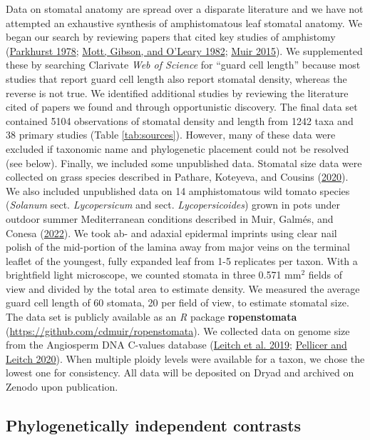 \documentclass[
  12pt,
]{article}
\begin{document}
Data on stomatal anatomy are spread over a disparate literature and we have not attempted an exhaustive synthesis of amphistomatous leaf stomatal anatomy. We began our search by reviewing papers that cited key studies of amphistomy (\protect\hyperlink{ref-parkhurst_adaptive_1978}{Parkhurst 1978}; \protect\hyperlink{ref-mott_adaptive_1982}{Mott, Gibson, and O'Leary 1982}; \protect\hyperlink{ref-muir_making_2015}{Muir 2015}). We supplemented these by searching Clarivate \emph{Web of Science} for ``guard cell length'' because most studies that report guard cell length also report stomatal density, whereas the reverse is not true. We identified additional studies by reviewing the literature cited of papers we found and through opportunistic discovery. The final data set contained 5104 observations of stomatal density and length from 1242 taxa and 38 primary studies (Table \ref{tab:sources}). However, many of these data were excluded if taxonomic name and phylogenetic placement could not be resolved (see below). Finally, we included some unpublished data. Stomatal size data were collected on grass species described in Pathare, Koteyeva, and Cousins (\protect\hyperlink{ref-pathare_increased_2020}{2020}). We also included unpublished data on 14 amphistomatous wild tomato species (\emph{Solanum} sect. \emph{Lycopersicum} and sect. \emph{Lycopersicoides}) grown in pots under outdoor summer Mediterranean conditions described in Muir, Galmés, and Conesa (\protect\hyperlink{ref-muir_unpublished_2022}{2022}). We took ab- and adaxial epidermal imprints using clear nail polish of the mid-portion of the lamina away from major veins on the terminal leaflet of the youngest, fully expanded leaf from 1-5 replicates per taxon. With a brightfield light microscope, we counted stomata in three 0.571 mm\(^2\) fields of view and divided by the total area to estimate density. We measured the average guard cell length of 60 stomata, 20 per field of view, to estimate stomatal size. The data set is publicly available as an \emph{R} package \textbf{ropenstomata} (\url{https://github.com/cdmuir/ropenstomata}). We collected data on genome size from the Angiosperm DNA C-values database (\protect\hyperlink{ref-leitch_angiosperm_2019}{Leitch et al. 2019}; \protect\hyperlink{ref-pellicer_plant_2020}{Pellicer and Leitch 2020}). When multiple ploidy levels were available for a taxon, we chose the lowest one for consistency. All data will be deposited on Dryad and archived on Zenodo upon publication.

\hypertarget{phylogenetically-independent-contrasts}{%
\subsection{Phylogenetically independent contrasts}\label{phylogenetically-independent-contrasts}}
\end{document}
